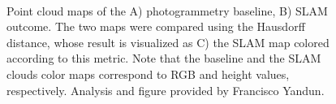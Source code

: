 \begin{figure}[h!]
   \centering
   \\%
   \caption{Point cloud maps of the A) photogrammetry baseline, B) SLAM outcome. The two maps were compared using the Hausdorff distance, whose result is visualized as C) the SLAM map colored according to this metric. Note that the baseline and the SLAM clouds color maps correspond to RGB and height values, respectively. Analysis and figure provided by Francisco Yandun.}
   \label{fig:results:slam_photogrametry_comparison}                %
\end{figure}

